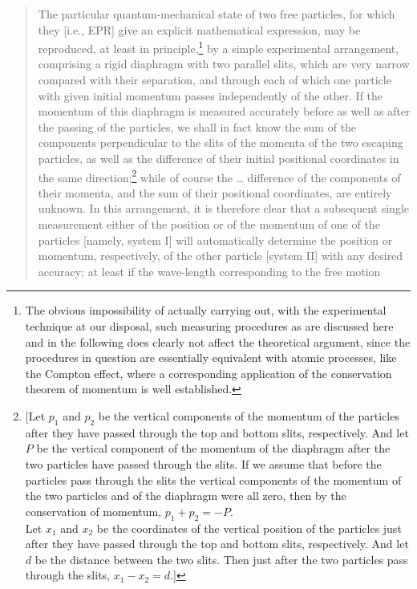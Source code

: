 \begin{quote}
The particular quantum-mechanical state of two free particles, for which
they {[}i.e., EPR{]} give an explicit mathematical expression, may be
reproduced, at least in principle,\footnote{The obvious impossibility of
  actually carrying out, with the experimental technique at our
  disposal, such measuring procedures as are discussed here and in the
  following does clearly not affect the theoretical argument, since the
  procedures in question are essentially equivalent with atomic
  processes, like the Compton effect, where a corresponding application
  of the conservation theorem of momentum is well established.} by a
simple experimental arrangement, comprising a rigid diaphragm with two
parallel slits, which are very narrow compared with their separation,
and through each of which one particle with given initial momentum
passes independently of the other. If the momentum of this diaphragm is
measured accurately before as well as after the passing of the
particles, we shall in fact know the sum of the components perpendicular
to the slits of the momenta of the two escaping particles, as well as
the difference of their initial positional coordinates in the same
direction;\footnote{{[}Let $p_1$ and $p_2$ be the vertical
  components of the momentum of the particles after they have passed
  through the top and bottom slits, respectively. And let $P$ be
  the vertical component of the momentum of the diaphragm after the two
  particles have passed through the slits. If we assume that before the
  particles pass through the slits the vertical components of the
  momentum of the two particles and of the diaphragm were all zero, then
  by the conservation of momentum, $p_1 + p_2 = -P$.\\
  Let $x_1$ and $x_2$ be the coordinates of the vertical
  position of the particles just after they have passed through the top
  and bottom slits, respectively. And let $d$ be the distance
  between the two slits. Then just after the two particles pass through
  the slits, $x_1 - x_2 = d$.]\label{entangle}} while of course the
\ldots{} difference of the components of their momenta, and the sum of
their positional coordinates, are entirely unknown. In this arrangement,
it is therefore clear that a subsequent single measurement either of the
position or of the momentum of one of the particles {[}namely, system
I{]} will automatically determine the position or momentum,
respectively, of the other particle {[}system II{]} with any desired
accuracy; at least if the wave-length corresponding to the free motion

\end{quote}
